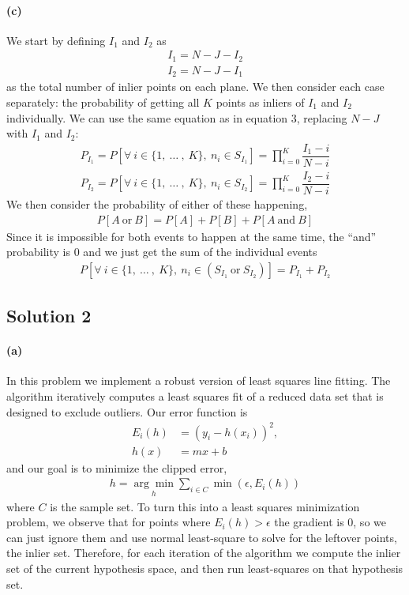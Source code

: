 \documentclass{article}
\newcommand{\solution}[1]{\clearpage \subsection*{Solution #1}}
\newcommand{\spart}[1]{\paragraph{(#1)}}
\begin{document}
\spart{c} We start by defining $I_1$ and $I_2$ as 
\begin{align}
	I_1 = N-J-I_2 \\
	I_2 = N-J-I_1
\end{align}
as the total number of inlier points on each plane. We then consider each case separately: the probability of getting all $K$ points as inliers of $I_1$ and $I_2$ individually. We can use the same equation as in equation 3, replacing $N-J$ with $I_1$ and $I_2$: 
\begin{align}
	P_{I_1} = P[\forall\  i \in \{1, \ \dots \ ,\ K\},\  n_i \in S_{I_1}] = \prod_{i=0}^{K} \dfrac{I_1-i}{N-i} \\
	P_{I_2} = P[\forall\  i \in \{1, \ \dots \ ,\ K\},\  n_i \in S_{I_2}] = \prod_{i=0}^{K} \dfrac{I_2-i}{N-i} 
\end{align}
We then consider the probability of either of these happening,
\begin{align}
	P[A \ \text{or}\  B] = P[A] + P[B] + P[A \ \text{and}\  B]
\end{align} 
Since it is impossible for both events to happen at the same time, the ``and'' probability is 0 and we just get the sum of the individual events
\begin{align}
	P[\forall\  i \in \{1, \ \dots \ ,\ K\},\  n_i \in (S_{I_1} \ \text{or} \ S_{I_2})] = 	P_{I_1}+P_{I_2}
\end{align}

\solution{2} 

\spart{a} In this problem we implement a robust version of least squares line fitting. The algorithm iteratively computes a least squares fit of a reduced data set that is designed to exclude outliers. Our error function is
\begin{align}
	E_i(h) &= \left(y_i-h(x_i)\right)^2,\\
	h(x) &= mx + b
\end{align}
and our goal is to minimize the clipped error,
\begin{align}
	h = \underset{h}{\arg \min}\sum_{i\in C}\min\left(\epsilon,E_i(h)\right)
\end{align}
where $C$ is the sample set. To turn this into a least squares minimization problem, we observe that for points where $E_i(h) > \epsilon$ the gradient is 0, so we can just ignore them and use normal least-square to solve for the leftover points, the inlier set. Therefore, for each iteration of the algorithm we compute the inlier set of the current hypothesis space, and then run least-squares on that hypothesis set. 
\end{document}
